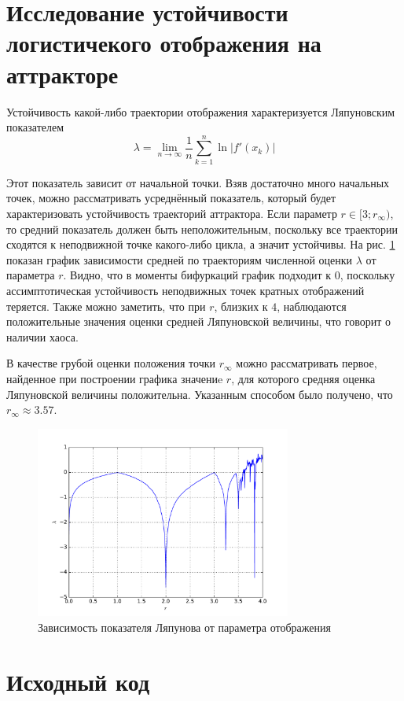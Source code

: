 \documentclass[a4paper]{article}
\begin{document}
\section{Исследование устойчивости логистичекого отображения на аттракторе}

Устойчивость какой-либо траектории отображения характеризуется Ляпуновским показателем
\begin{displaymath}
\lambda = \lim_{n \to \infty} \frac{1}{n}\sum_{k=1}^{n}\ln|f'(x_k)|
\end{displaymath}

Этот показатель зависит от начальной точки. Взяв достаточно много начальных точек,
можно рассматривать усреднённый показатель, который будет характеризовать устойчивость
траекторий аттрактора. Если параметр \(r\in [3;r_\infty)\), то средний показатель
должен быть неположительным, поскольку все траектории сходятся к неподвижной точке
какого-либо цикла, а значит устойчивы. На рис. \ref{fig:lyapunov_characteristic}
показан график зависимости средней по траекториям численной оценки \(\lambda\) от параметра \(r\).
Видно, что в моменты бифуркаций график подходит к \(0\), поскольку ассимптотическая
устойчивость неподвижных точек кратных отображений теряется. Также можно заметить, что
при \(r\), близких к \(4\), наблюдаются положительные значения оценки средней Ляпуновской величины,
что говорит о наличии хаоса.

В качестве грубой оценки положения точки \(r_\infty\) можно рассматривать первое, найденное
при построении графика значениe \(r\), для которого средняя оценка Ляпуновской величины положительна.
Указанным способом было получено, что \(r_\infty \approx 3.57\).

\begin{figure}[H]
	\center
	\includegraphics[width=0.75\textwidth]{../pictures/lab6_lyapunov_characteristic.pdf}
	\caption{Зависимость показателя Ляпунова от параметра отображения}
	\label{fig:lyapunov_characteristic}
\end{figure}

\section{Исходный код}

\end{document}
